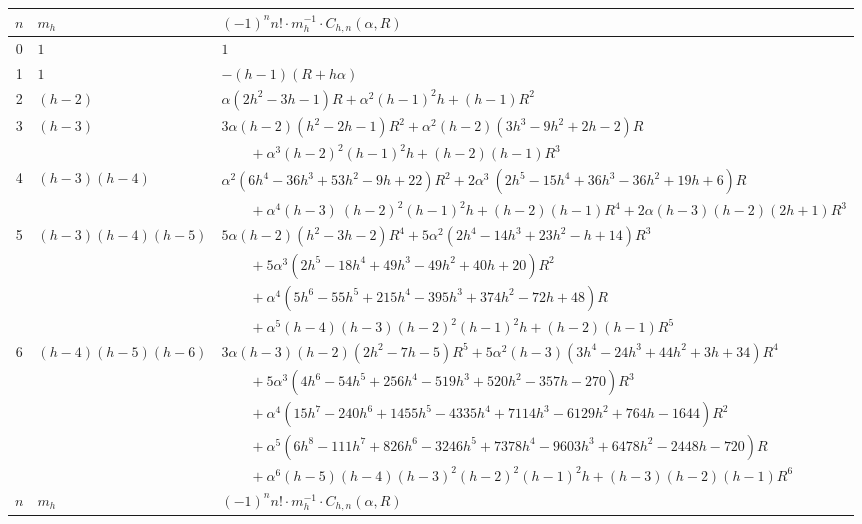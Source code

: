 \documentclass[12pt,reqno]{article}
\numberwithin{sfootnote}{section}
\newcommand{\tabletopstrut}[0]{\rule{0pt}{3ex}}
\numberwithin{equation}{section}
\theoremstyle{plain}
\theoremstyle{definition}
\theoremstyle{remark}
\begin{document}
\begin{table}[h]
\begin{subtable}{\textwidth}
\begin{tabular}{|c|l|l|} \hline 
\hline\tabletopstrut 
$n$ & $m_{h}$ & $(-1)^{n} n! \cdot m_h^{-1} \cdot C_{h,n}(\alpha, R)$ \\ \hline 
0 & $1$ & $1$ \\ 
1 & $1$ & $-(h-1) (R+ h\alpha)$ \\ 
2 & $(h-2)$ & 
    $\alpha  \left(2 h^2-3 h-1\right) R+\alpha ^2 (h-1)^2 h+(h-1) R^2$ \\ 
3 & $(h-3)$ & 
    $3 \alpha  (h-2) \left(h^2-2 h-1\right) R^2+ 
     \alpha ^2 (h-2) \left(3 h^3-9 h^2+2 h-2\right) R$ \\ 
  & & 
    $\qquad + 
     \alpha ^3 (h-2)^2 (h-1)^2 h+(h-2) (h-1) R^3$ \\ 
4 & $(h-3)(h-4)$ & 
    $\alpha ^2 \left(6 h^4-36 h^3+53 h^2-9 h+22\right) R^2+2 \alpha ^3 \
     \left(2 h^5-15 h^4+36 h^3-36 h^2+19 h+6\right) R$ \\ 
  & & 
    $\qquad + 
     \alpha ^4 (h-3) \
     (h-2)^2 (h-1)^2 h+(h-2) (h-1) R^4+2 \alpha  (h-3) (h-2) (2 h+1) R^3$ \\ 
5 & $(h-3)(h-4)(h-5)$ & 
    $5 \alpha  (h-2) \left(h^2-3 h-2\right) R^4+5 \alpha ^2 \left(2 h^4-14 h^3+23 h^2-h+14\right) R^3$ \\ 
  & & 
    $\qquad + 
     5 \alpha ^3 \left(2 h^5-18 h^4+49 h^3-49 h^2+40 h+20\right) R^2$ \\ 
  & & 
    $\qquad + 
     \alpha ^4 \left(5 h^6-55 h^5+215 h^4-395 h^3+374 h^2-72 h+48\right) R$ \\ 
  & & 
    $\qquad + 
     \alpha ^5 (h-4) (h-3) (h-2)^2 (h-1)^2 h+(h-2) (h-1) R^5$ \\ 
6 & $(h-4)(h-5)(h-6)$ & 
    $3 \alpha  (h-3) (h-2) \left(2 h^2-7 h-5\right) R^5+5 \alpha ^2 (h-3) \left(3 h^4-24 h^3+44 h^2+3 h+34\right) R^4$ \\ 
  & & 
    $\qquad + 
     5 \alpha ^3 \left(4 h^6-54 h^5+256 h^4-519 h^3+520 h^2-357 h-270\right) R^3$ \\ 
  & & 
    $\qquad + 
     \alpha ^4 \left(15 h^7-240 h^6+1455 h^5-4335 h^4+7114 h^3-6129 h^2+764 h-1644\right) R^2$ \\ 
  & & 
    $\qquad + 
     \alpha ^5 \left(6 h^8-111 h^7+826 h^6-3246 h^5+7378 h^4-9603 h^3+6478 h^2-2448 h-720\right) R$ \\ 
  & & 
    $\qquad + 
     \alpha ^6 (h-5) (h-4) (h-3)^2 (h-2)^2 (h-1)^2 h+(h-3) (h-2) (h-1) R^6$ \\ \hline 
\hline\tabletopstrut 
$n$ & $m_{h}$ & $(-1)^{n} n! \cdot m_h^{-1} \cdot C_{h,n}(\alpha, R)$ \\ \hline 

\end{tabular}
\end{subtable}
\end{table}
\end{document}
